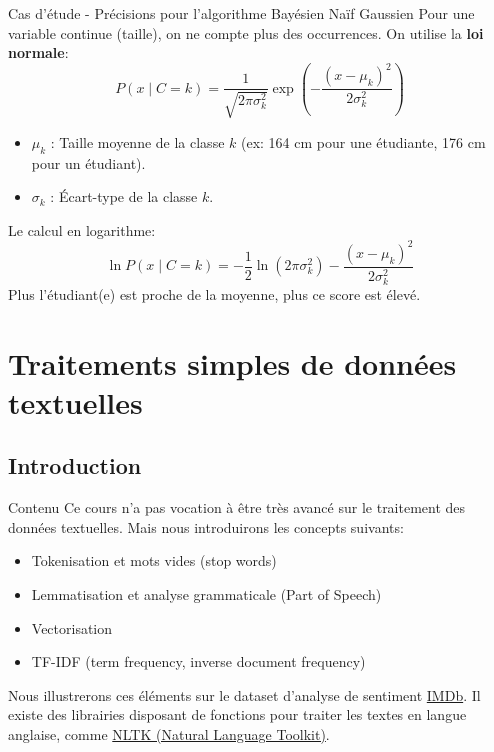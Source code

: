 \documentclass[10pt]{beamer}  %
\begin{document}
\begin{frame}{Cas d'étude - Précisions pour l'algorithme Bayésien Naïf Gaussien}
	Pour une variable continue (taille), on ne compte plus des occurrences. On utilise la \textbf{loi normale}:
	\begin{equation}
		P(x \mid C=k) = \frac{1}{\sqrt{2\pi\sigma_k^2}} \exp\left(-\frac{(x-\mu_k)^2}{2\sigma_k^2}\right)
		\nonumber
	\end{equation}
	\pause
	\begin{itemize}
		\item $\mu_k$ : Taille moyenne de la classe $k$ (ex: 164 cm pour une étudiante, 176 cm pour un étudiant).
		\item $\sigma_k$ : \'Ecart-type de la classe $k$.
	\end{itemize}
	\pause
	\vspace{0.3cm}
	Le calcul en logarithme:
	\begin{equation}
		\ln P(x \mid C=k) = -\frac{1}{2} \ln(2\pi\sigma_k^2) - \frac{(x-\mu_k)^2}{2\sigma_k^2}
		\nonumber
	\end{equation}
	Plus l'étudiant(e) est proche de la moyenne, plus ce score est élevé.
\end{frame}


\section[Traitements simples de données textuelles]{Traitements simples de données textuelles}

\subsection[Introduction]{Introduction}

\begin{frame}{Contenu}
	Ce cours n'a pas vocation à être très avancé sur le traitement des données textuelles. Mais nous introduirons les concepts suivants:
	\begin{itemize}
		\item Tokenisation et mots vides (stop words)
		\item Lemmatisation et analyse grammaticale (Part of Speech)
		\item Vectorisation
		\item TF-IDF (term frequency, inverse document frequency)
	\end{itemize}
	Nous illustrerons ces éléments sur le dataset d'analyse de sentiment \href{https://www.kaggle.com/datasets/yasserh/imdb-movie-ratings-sentiment-analysis}{IMDb}. Il existe des librairies disposant de fonctions pour traiter les textes en langue anglaise, comme \href{https://www.nltk.org/}{NLTK (Natural Language Toolkit)}.
\end{frame}
\end{document}
